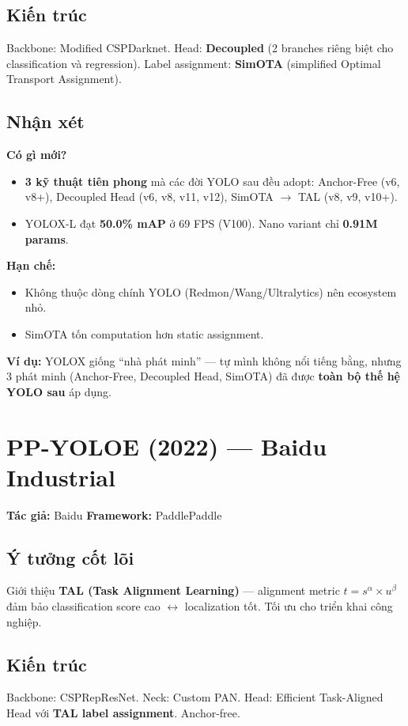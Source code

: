 \documentclass[12pt,a4paper]{report}
\begin{document}
\subsection{Kiến trúc}
Backbone: Modified CSPDarknet. Head: \textbf{Decoupled} (2 branches riêng biệt cho classification và regression). Label assignment: \textbf{SimOTA} (simplified Optimal Transport Assignment).

\subsection{Nhận xét}

\textbf{Có gì mới?}
\begin{itemize}
    \item \textbf{3 kỹ thuật tiên phong} mà các đời YOLO sau đều adopt: Anchor-Free (v6, v8+), Decoupled Head (v6, v8, v11, v12), SimOTA $\rightarrow$ TAL (v8, v9, v10+).
    \item YOLOX-L đạt \textbf{50.0\% mAP} ở 69 FPS (V100). Nano variant chỉ \textbf{0.91M params}.
\end{itemize}

\textbf{Hạn chế:}
\begin{itemize}
    \item Không thuộc dòng chính YOLO (Redmon/Wang/Ultralytics) nên ecosystem nhỏ.
    \item SimOTA tốn computation hơn static assignment.
\end{itemize}

\textbf{Ví dụ:} YOLOX giống ``nhà phát minh'' --- tự mình không nổi tiếng bằng, nhưng 3 phát minh (Anchor-Free, Decoupled Head, SimOTA) đã được \textbf{toàn bộ thế hệ YOLO sau} áp dụng.

\section{PP-YOLOE (2022) --- Baidu Industrial}
\textbf{Tác giả:} Baidu \hfill \textbf{Framework:} PaddlePaddle

\subsection{Ý tưởng cốt lõi}
Giới thiệu \textbf{TAL (Task Alignment Learning)} --- alignment metric $t = s^\alpha \times u^\beta$ đảm bảo classification score cao $\leftrightarrow$ localization tốt. Tối ưu cho triển khai công nghiệp.

\subsection{Kiến trúc}
Backbone: CSPRepResNet. Neck: Custom PAN. Head: Efficient Task-Aligned Head với \textbf{TAL label assignment}. Anchor-free.
\end{document}
